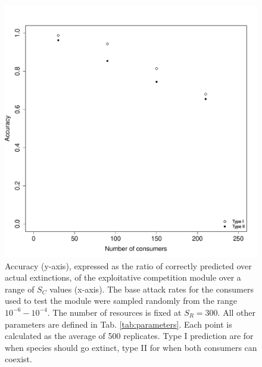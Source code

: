 \documentclass[a4paper]{report}
\begin{document}
\begin{figure}[H]

\centering{}
\includegraphics[scale=0.5]{../Images/Validation_exploitative.pdf}
 \caption{Accuracy (y-axis), expressed as the ratio of correctly predicted over actual extinctions, of the exploitative competition module over a range of $S_C$ values (x-axis). The base attack rates for the consumers used to test the module were sampled randomly from the range $10^{-6}-10^{-4}$. The number of resources is fixed at $S_R=300$. All other parameters are defined in Tab. \ref{tab:parameters}. Each point is calculated as the average of 500 replicates. Type I prediction are for when species should go extinct, type II for when both consumers can coexist.\label{fig:Validation_exploitative}}
\end{figure}
\end{document}
